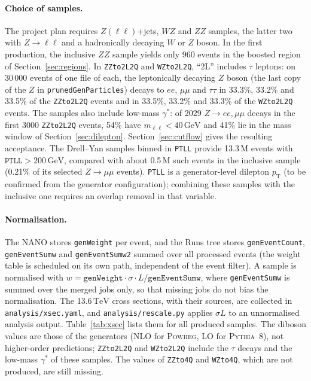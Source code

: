 \documentclass[11pt]{article}
\newcommand{\pt}{p_{\mathrm{T}}}
\newcommand{\GeV}{\ensuremath{\,\mathrm{GeV}}}
\newcommand{\TeV}{\ensuremath{\,\mathrm{TeV}}}
\newcommand{\code}[1]{\texttt{#1}}
\begin{document}
\paragraph{Choice of samples.} The project plan requires $Z(\ell\ell)$+jets, $WZ$ and $ZZ$ samples, the latter two
with $Z\to\ell\ell$ and a hadronically decaying $W$ or $Z$ boson. In the first production, the inclusive $ZZ$ sample
yields only 960 events in the boosted region of Section~\ref{sec:regions}. In \code{ZZto2L2Q} and \code{WZto2L2Q},
``2L'' includes $\tau$ leptons: on 30\,000 events of one file of each, the leptonically decaying $Z$ boson (the last
copy of the $Z$ in \code{prunedGenParticles}) decays to $ee$, $\mu\mu$ and $\tau\tau$ in 33.3\%, 33.2\% and 33.5\% of
the \code{ZZto2L2Q} events and in 33.5\%, 33.2\% and 33.3\% of the \code{WZto2L2Q} events. The samples also include
low-mass $\gamma^*$: of 2029 $Z\to ee,\mu\mu$ decays in the first 3000 \code{ZZto2L2Q} events, 54\% have
$m_{\ell\ell} < 40\GeV$ and 41\% lie in the mass window of Section~\ref{sec:dilepton}. Section~\ref{sec:cutflow} gives
the resulting acceptance. The Drell--Yan samples binned in \code{PTLL} provide 13.3\,M events with $\code{PTLL} > 200\GeV$,
compared with about 0.5\,M such events in the inclusive sample (0.21\% of its selected $Z\to\mu\mu$ events).
\code{PTLL} is a generator-level dilepton $\pt$ (to be confirmed from the generator configuration); combining these
samples with the inclusive one requires an overlap removal in that variable.

\paragraph{Normalisation.} The NANO stores \code{genWeight} per event, and the Runs tree stores \code{genEventCount},
\code{genEventSumw} and \code{genEventSumw2} summed over all processed events (the weight table is scheduled on its own
path, independent of the event filter). A sample is normalised with
$w = \code{genWeight}\cdot\sigma\cdot L/\code{genEventSumw}$, where \code{genEventSumw} is summed over the merged jobs
only, so that missing jobs do not bias the normalisation. The 13.6\TeV{} cross sections, with their sources, are
collected in \code{analysis/xsec.yaml}, and \code{analysis/rescale.py} applies $\sigma L$ to an unnormalised analysis
output. Table~\ref{tab:xsec} lists them for all produced samples. The diboson values are those of the generators (NLO
for \textsc{Powheg}, LO for \textsc{Pythia}~8), not higher-order predictions; \code{ZZto2L2Q} and \code{WZto2L2Q}
include the $\tau$ decays and the low-mass $\gamma^*$ of these samples. The values of \code{ZZto4Q} and \code{WZto4Q},
which are not produced, are still missing.
\end{document}
